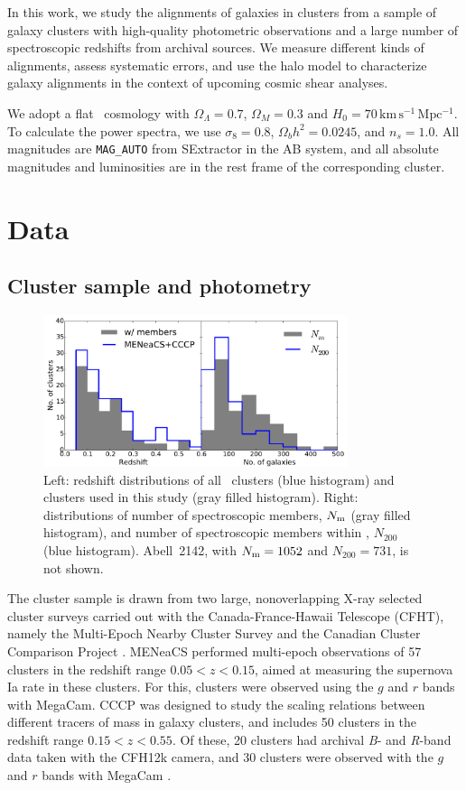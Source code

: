 In this work, we study the alignments of galaxies in clusters from a sample of galaxy clusters with 
high-quality photometric observations and a large number of spectroscopic redshifts from archival 
sources. We measure different kinds of alignments, assess systematic errors, and use the halo model 
to characterize galaxy alignments in the context of upcoming cosmic shear analyses.

We adopt a flat \lcdm\ cosmology with $\Omega_\Lambda=0.7$, $\Omega_M=0.3$ and
$H_0=70\,\mathrm{km\,s^{-1}\,Mpc^{-1}}$. To calculate the power spectra, we use $\sigma_8=0.8$, 
$\Omega_bh^2=0.0245$, and $n_s=1.0$. All magnitudes are \texttt{MAG\_AUTO} from SExtractor in the 
AB system, and all absolute magnitudes and luminosities are in the rest frame of the corresponding 
cluster. 

\section{Data}

\subsection{Cluster sample and photometry}\label{s:photometry}

\begin{figure}
 \centerline{\includegraphics[width=3.5in]{chapter4/Nmembers.pdf}}
 \caption{\small Left: redshift distributions of all \mc\ clusters (blue histogram) and 
clusters used in this study (gray filled histogram). Right: distributions of number of 
spectroscopic members, $N_{\rm m}$ (gray filled histogram), and number of spectroscopic members within 
\radius, $N_{200}$ (blue histogram). Abell~2142, with $N_{\rm m}=1052$ and $N_{200}=731$, is not shown.}
\label{f:Nm}
\end{figure}

The cluster sample is drawn from two large, nonoverlapping X-ray selected cluster surveys carried 
out with the Canada-France-Hawaii Telescope (CFHT), namely the Multi-Epoch Nearby Cluster Survey 
\citep[MENeaCS;][]{sand12} and the Canadian Cluster Comparison Project \citep[CCCP;][]{hoekstra12}. 
MENeaCS performed multi-epoch observations of 57 clusters in the redshift range $0.05<z<0.15$, 
aimed at measuring the supernova Ia rate in these clusters. For this, clusters were observed using 
the $g$ and $r$ bands with MegaCam. CCCP was designed to study the scaling relations between 
different tracers of mass in galaxy clusters, and includes 50 clusters in the redshift range 
$0.15<z<0.55$. Of these, 20 clusters had archival {\it B}- and {\it R}-band data taken with the 
CFH12k camera, and 30 clusters were observed with the $g$ and $r$ bands with MegaCam 
\citep{hoekstra07,hoekstra12}.

